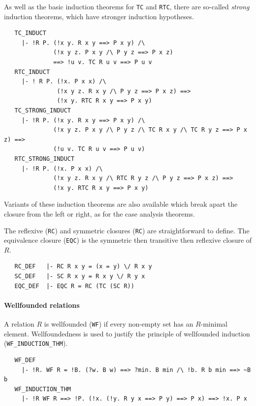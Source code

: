 As well as the basic induction theorems for {\small\verb+TC+} and
{\small\verb+RTC+}, there are so-called \emph{strong} induction
theorems, which have stronger induction hypotheses.
%
\begin{hol}
\begin{verbatim}
   TC_INDUCT
     |- !R P. (!x y. R x y ==> P x y) /\
              (!x y z. P x y /\ P y z ==> P x z)
              ==> !u v. TC R u v ==> P u v
   RTC_INDUCT
     |- ! R P. (!x. P x x) /\
               (!x y z. R x y /\ P y z ==> P x z) ==>
               (!x y. RTC R x y ==> P x y)
   TC_STRONG_INDUCT
     |- !R P. (!x y. R x y ==> P x y) /\
              (!x y z. P x y /\ P y z /\ TC R x y /\ TC R y z ==> P x z) ==>
              (!u v. TC R u v ==> P u v)
   RTC_STRONG_INDUCT
     |- !R P. (!x. P x x) /\
              (!x y z. R x y /\ RTC R y z /\ P y z ==> P x z) ==>
              (!x y. RTC R x y ==> P x y)
\end{verbatim}
\end{hol}
Variants of these induction theorems are also available which break
apart the closure from the left or right, as for the case analysis theorems.

\medskip

The reflexive ({\small\verb+RC+}) and symmetric closures
({\small\verb+RC+}) are straightforward to define. The equivalence
closure ({\small\verb+EQC+}) is the symmetric then transitive then
reflexive closure of $R$.
%
\begin{hol}
\begin{verbatim}
   RC_DEF   |- RC R x y = (x = y) \/ R x y
   SC_DEF   |- SC R x y = R x y \/ R y x
   EQC_DEF  |- EQC R = RC (TC (SC R))
\end{verbatim}
\end{hol}

\paragraph {Wellfounded relations}

A relation $R$ is wellfounded ({\small\verb+WF+}) if every non-empty set
has an $R$-minimal element. Wellfoundedness is used to justify the
principle of wellfounded induction ({\small\verb+WF_INDUCTION_THM+}).
%
\begin{hol}
\begin{verbatim}
   WF_DEF
     |- !R. WF R = !B. (?w. B w) ==> ?min. B min /\ !b. R b min ==> ~B b
   WF_INDUCTION_THM
     |- !R WF R ==> !P. (!x. (!y. R y x ==> P y) ==> P x) ==> !x. P x
\end{verbatim}
\end{hol}

